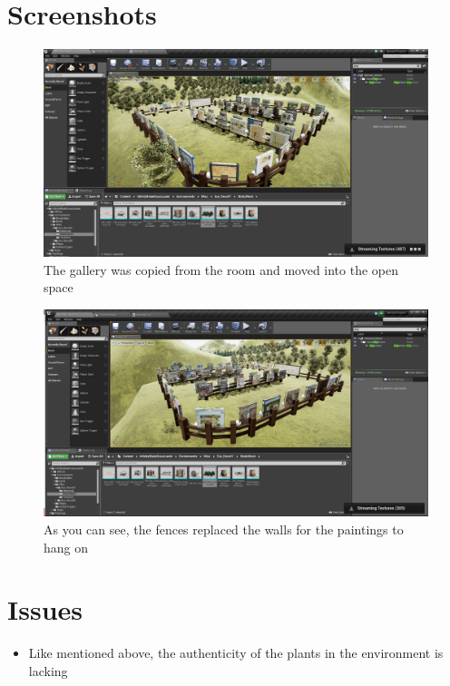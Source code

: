 \documentclass[11pt]{book}
\begin{document}
\section*{Screenshots}
\begin{figure}
\caption{The gallery was copied from the room and moved into the open space}
\centering
\includegraphics[scale=0.40]{Pic1.png}
\end{figure}

\begin{figure}
\caption{As you can see, the fences replaced the walls for the paintings to hang on}
\centering
\includegraphics[scale=0.40]{Pic2.png}
\end{figure}

\section*{Issues}
\begin{itemize}
\item Like mentioned above, the authenticity of the plants in the environment is lacking
\end{itemize}
\end{document}
